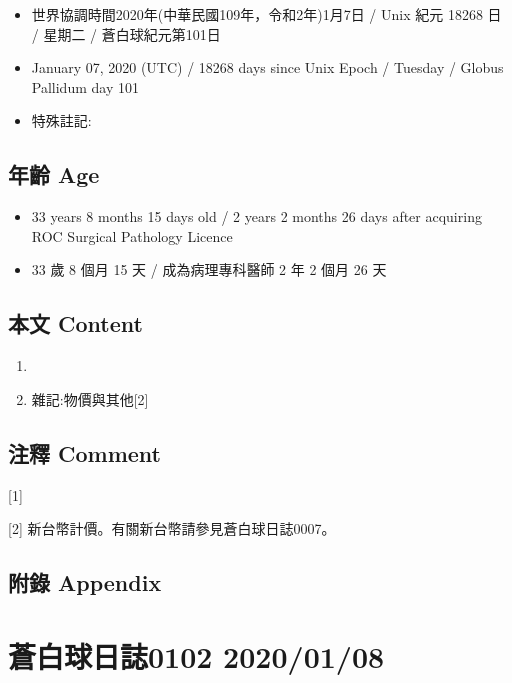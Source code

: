 \documentclass[a5paper, 12pt
]{book}
\providecommand{\tightlist}{%
  \setlength{\itemsep}{0pt}\setlength{\parskip}{0pt}}
\begin{document}
\begin{itemize}
\tightlist
\item
  世界協調時間2020年(中華民國109年，令和2年)1月7日 / Unix 紀元 18268 日
  / 星期二 / 蒼白球紀元第101日
\item
  January 07, 2020 (UTC) / 18268 days since Unix Epoch / Tuesday /
  Globus Pallidum day 101
\item
  特殊註記:
\end{itemize}

\hypertarget{ux5e74ux9f61-age-37}{%
\subsection{年齡 Age}\label{ux5e74ux9f61-age-37}}

\begin{itemize}
\tightlist
\item
  33 years 8 months 15 days old / 2 years 2 months 26 days after
  acquiring ROC Surgical Pathology Licence
\item
  33 歲 8 個月 15 天 / 成為病理專科醫師 2 年 2 個月 26 天
\end{itemize}

\hypertarget{ux672cux6587-content-37}{%
\subsection{本文 Content}\label{ux672cux6587-content-37}}

\begin{enumerate}
\def\labelenumi{\arabic{enumi}.}
\item
\item
  雜記:物價與其他{[}2{]}
\end{enumerate}

\hypertarget{ux6ce8ux91cb-comment-36}{%
\subsection{注釋 Comment}\label{ux6ce8ux91cb-comment-36}}

{[}1{]}

{[}2{]} 新台幣計價。有關新台幣請參見蒼白球日誌0007。

\hypertarget{ux9644ux9304-appendix-37}{%
\subsection{附錄 Appendix}\label{ux9644ux9304-appendix-37}}

\hypertarget{ux84bcux767dux7403ux65e5ux8a8c0102-20200108}{%
\section{蒼白球日誌0102
2020/01/08}\label{ux84bcux767dux7403ux65e5ux8a8c0102-20200108}}
\end{document}

